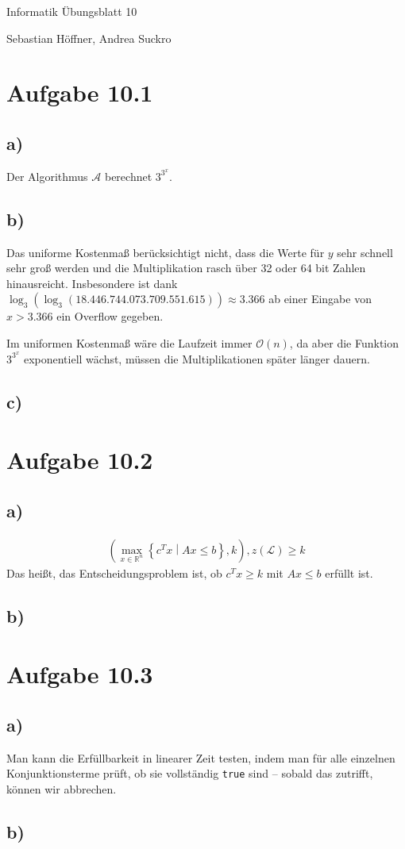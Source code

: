 \documentclass{article}
\begin{document}
\begin{center}
  \Large{Informatik \raisebox{0.05em}{:} Übungsblatt 10}

  \large{Sebastian Höffner, Andrea Suckro}
\end{center}



\section*{Aufgabe 10.1}
\subsection*{a)}
Der Algorithmus $\mathcal{A}$ berechnet $3^{3^x}$.


\subsection*{b)}
Das uniforme Kostenmaß berücksichtigt nicht, dass die Werte für $y$ sehr schnell sehr groß werden und die Multiplikation rasch über 32 oder 64 bit Zahlen hinausreicht.
Insbesondere ist dank $\log_3(\log_3(18.446.744.073.709.551.615)) \approx 3.366$ ab einer Eingabe von $x > 3.366$ ein Overflow gegeben.

Im uniformen Kostenmaß wäre die Laufzeit immer $\mathcal{O}(n)$, da aber die Funktion $3^{3^x}$ exponentiell wächst, müssen die Multiplikationen später länger dauern.


\subsection*{c)}




\section*{Aufgabe 10.2}

\subsection*{a)}
\begin{align*}
\left(\max\limits_{x\in\mathbb{R}^n}\left\{c^Tx\middle|Ax\leq b\right\}, k\right), z(\mathcal{L})\geq k
\end{align*}
Das heißt, das Entscheidungsproblem ist, ob $c^Tx \geq k$ mit $Ax \leq b$ erfüllt ist.

\subsection*{b)}
\begin{algorithm}
\end{algorithm}



\section*{Aufgabe 10.3}
\subsection*{a)}
Man kann die Erfüllbarkeit in linearer Zeit testen, indem man für alle einzelnen Konjunktionsterme prüft, ob sie vollständig \texttt{true} sind -- sobald das zutrifft, können wir abbrechen.

\subsection*{b)}
\end{document}

